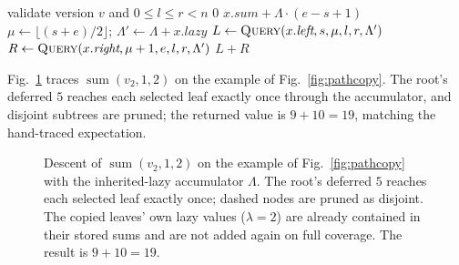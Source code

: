 \documentclass[conference]{IEEEtran}
\begin{document}
\begin{algorithm}[!t]
\caption{Historical range-sum query}
\label{alg:query}
\begin{algorithmic}[1]
  \State validate version $v$ and $0 \leq l \leq r < n$
  \State \Return {}
\EndProcedure
\Statex
{} 
   \Return $0$ 
  \EndIf
   
    \State \Return $x.\textit{sum} + \Lambda \cdot (e - s + 1)$
  \EndIf
  \State $\mu \gets \lfloor (s+e)/2 \rfloor$;\;
         $\Lambda' \gets \Lambda + x.\textit{lazy}$
  \State $L \gets \Call{Query}{x.\textit{left}, s, \mu, l, r, \Lambda'}$
  \State $R \gets \Call{Query}{x.\textit{right}, \mu+1, e, l, r, \Lambda'}$
  \State \Return $L + R$
\EndFunction
\end{algorithmic}
\end{algorithm}

Fig.~\ref{fig:query} traces $\operatorname{sum}(v_2, 1, 2)$ on the example of
Fig.~\ref{fig:pathcopy}. The root's deferred $5$ reaches each selected leaf exactly once through
the accumulator, and disjoint subtrees are pruned; the returned value is $9 + 10 = 19$, matching
the hand-traced expectation.

\begin{figure}[!t]
\centering
{}
\caption{Descent of $\operatorname{sum}(v_2,1,2)$ on the example of Fig.~\ref{fig:pathcopy} with
the inherited-lazy accumulator $\Lambda$. The root's deferred $5$ reaches each selected leaf
exactly once; dashed nodes are pruned as disjoint. The copied leaves' own lazy values
($\lambda{=}2$) are already contained in their stored sums and are not added again on full
coverage. The result is $9+10=19$.}
\label{fig:query}
\end{figure}
\end{document}
